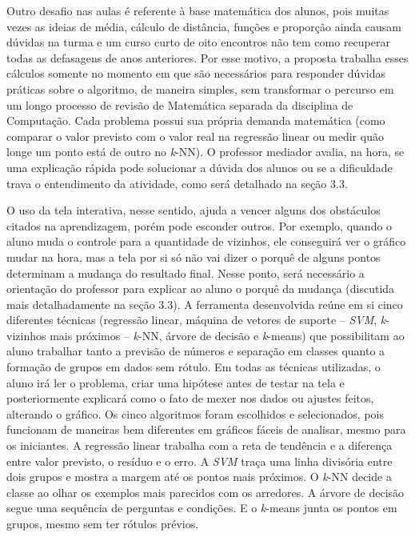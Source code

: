 Outro desafio nas aulas é referente à base matemática dos alunos, pois muitas vezes as ideias de média, cálculo de distância, funções e proporção ainda causam dúvidas na turma e um curso curto de oito encontros não tem como recuperar todas as defasagens de anos anteriores. Por esse motivo, a proposta trabalha esses cálculos somente no momento em que são necessários para responder dúvidas práticas sobre o algoritmo, de maneira simples, sem transformar o percurso em um longo processo de revisão de Matemática separada da disciplina de Computação. Cada problema possui sua própria demanda matemática (como comparar o valor previsto com o valor real na regressão linear ou medir quão longe um ponto está de outro no \textit{k}-NN). O professor mediador avalia, na hora, se uma explicação rápida pode solucionar a dúvida dos alunos ou se a dificuldade trava o entendimento da atividade, como será detalhado na seção 3.3.

O uso da tela interativa, nesse sentido, ajuda a vencer alguns dos obstáculos citados na aprendizagem, porém pode esconder outros. Por exemplo, quando o aluno muda o controle para a quantidade de vizinhos, ele conseguirá ver o gráfico mudar na hora, mas a tela por si só não vai dizer o porquê de alguns pontos determinam a mudança do resultado final. Nesse ponto, será necessário a orientação do professor para explicar ao aluno o porquê da mudança (discutida mais detalhadamente na seção 3.3). A ferramenta desenvolvida reúne em si cinco diferentes técnicas (regressão linear, máquina de vetores de suporte -- \textit{SVM}, \textit{k}-vizinhos mais próximos -- \textit{k}-NN, árvore de decisão e \textit{k}-means) que possibilitam ao aluno trabalhar tanto a previsão de números e separação em classes quanto a formação de grupos em dados sem rótulo. Em todas as técnicas utilizadas, o aluno irá ler o problema, criar uma hipótese antes de testar na tela e posteriormente explicará como o fato de mexer nos dados ou ajustes feitos, alterando o gráfico. Os cinco algoritmos foram escolhidos e selecionados, pois funcionam de maneiras bem diferentes em gráficos fáceis de analisar, mesmo para os iniciantes. A regressão linear trabalha com a reta de tendência e a diferença entre valor previsto, o resíduo e o erro. A \textit{SVM} traça uma linha divisória entre dois grupos e mostra a margem até os pontos mais próximos. O \textit{k}-NN decide a classe ao olhar os exemplos mais parecidos com os arredores. A árvore de decisão segue uma sequência de perguntas e condições. E o \textit{k}-means junta os pontos em grupos, mesmo sem ter rótulos prévios.

